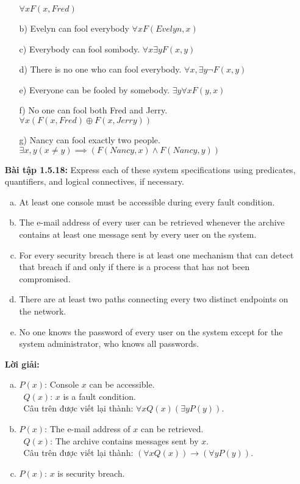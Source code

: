 \documentclass[a4paper]{article}
\begin{document}
\begin{enumerate}
\begin{enumerate}
	$\forall x F(x,Fred)$
	\item[b)] Evelyn can fool everybody
	$\forall x F(Evelyn,x)$
	\item[c)] Everybody can fool sombody.
	$\forall x \exists y F(x,y)$
	\item[d)] There is no one who can fool everybody.
	$\forall x, \exists y \lnot F(x,y)$
	\item[e)] Everyone can be fooled by somebody.
	$\exists y \forall x F(y,x)$
	\item[f)] No one can fool both Fred and Jerry.
	$\forall x (F(x,Fred) \oplus F(x,Jerry))$
	\item[g)] Nancy can fool exactly two people.
	$\exists x,y (x \ne y) \implies (F(Nancy,x) \land F(Nancy,y))$
\end{enumerate}
\textbf{Bài tập 1.5.18: }Express each of these system specifications using predicates, quantifiers, and logical connectives, if necessary.
\begin{enumerate}[a)]
\item At least one console must be accessible during every
fault condition.
\item The e-mail address of every user can be retrieved
whenever the archive contains at least one message sent by every user on the system.
\item For every security breach there is at least one mechanism that can detect that breach if and only if there is a process that has not been compromised.
\item There are at least two paths connecting every two distinct endpoints on the network.
\item No one knows the password of every user on the system except for the system administrator, who knows
all passwords.
\end{enumerate}
\textbf{Lời giải:}
\begin{enumerate}[a)]
\item $P(x)$: Console $x$ can be accessible. \\\
$Q(x)$: $x$ is a fault condition. \\\
Câu trên được viết lại thành: $\forall x Q(x) (\exists y P(y)).$
\item $P(x)$: The e-mail address of $x$ can be retrieved. \\\
$Q(x)$: The archive contains messages sent by $x$. \\\
Câu trên được viết lại thành: $(\forall x Q(x))\rightarrow (\forall y P(y)).$
\item $P(x)$: $x$ is security breach. \\\

\end{enumerate}
\end{enumerate}
\end{document}
